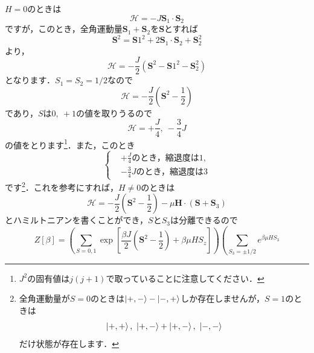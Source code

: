 \documentclass[a4paper,pdflatex,ja=standard]{bxjsarticle}
\begin{document}
\begin{enumerate}
  $H=0$のときは
  \begin{equation}
    \mathcal{H}
    =
    -J\bm{S}_1\cdot\bm{S}_2
  \end{equation}
  ですが，このとき，全角運動量$\bm{S}_1+\bm{S}_2$を$\bm{S}$とすれば
  \begin{equation}
    \bm{S}^2
    =
    \bm{S}1^2+2\bm{S}_1\cdot\bm{S}_2+\bm{S}_2^2
  \end{equation}
  より，
  \begin{equation}
    \mathcal{H}
    =
    -\frac{J}{2}
    (
      \bm{S}^2
      -
      \bm{S}1^2
      -
      \bm{S}_2^2
    )
  \end{equation}
  となります．$S_1=S_2=1/2$なので
  \begin{equation}
    \mathcal{H}
    =
    -\frac{J}{2}
    \left(
      \bm{S}^2
      -
      \frac{1}{2}
    \right)    
  \end{equation}
  であり，$S$は$0,\ +1$の値を取りうるので
  \begin{equation}
    \mathcal{H}
    =
    +\frac{J}{4}
    ,\ 
    -\frac{3}{4}J
  \end{equation}
  の値をとります\footnote{
    $J^2$の固有値は$j(j+1)$で取っていることに注意してください．
  }．また，このとき
  \begin{equation}
    \left\{
      \begin{alignedat}{1}
        &+\frac{J}{4}\text{のとき，縮退度は}1, \\
        &-\frac{3}{4}J\text{のとき，縮退度は}3
      \end{alignedat}
    \right.
  \end{equation}
  です\footnote{
    全角運動量が$S=0$のときは$\ket{+,-}-\ket{-,+}$しか存在しませんが，$S=1$のときは
    $$
      \ket{+,+}
      ,\ 
      \ket{+,-}+\ket{+,-}
      ,\ 
      \ket{-,-}
    $$
    だけ状態が存在します．
  }．これを参考にすれば，$H\neq0$のときは
  \begin{equation}
    \mathcal{H}
    =
    -\frac{J}{2}
    \left(
      \bm{S}^2
      -
      \frac{1}{2}
    \right)    
    -
    \mu\bm{H}\cdot(\bm{S}+\bm{S}_3)
  \end{equation}
  とハミルトニアンを書くことができ，$S$と$S_3$は分離できるので
  \begin{equation}
    Z[\beta]
    =
    \left(  
      \sum_{S=0,1}
      \exp\left[ 
        \frac{\beta J}{2}
        \left(
          \bm{S}^2
          -
          \frac{1}{2}
        \right)    
        +
        \beta\mu HS_z
      \right]
    \right)
    \left(  
      \sum_{S_3=\pm1/2}
      e^{\beta\mu HS_3}

\end{equation}
\end{enumerate}
\end{document}
